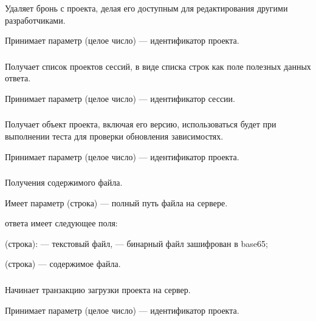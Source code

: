 Удаляет бронь с проекта, делая его доступным для редактирования другими разработчиками.

Принимает параметр  (целое число) — идентификатор проекта.

\subsubsection{}

Получает список проектов сессий, в виде списка строк как поле  полезных данных ответа.

Принимает параметр  (целое число) — идентификатор сессии.

\subsubsection{}

Получает объект проекта, включая его версию, использоваться будет при выполнении теста для проверки обновления зависимостях.

Принимает параметр  (целое число) — идентификатор проекта.

\subsubsection{}

Получения содержимого файла.

Имеет параметр  (строка) — полный путь файла на сервере.
 
 ответа имеет следующее поля:

\begin{icItems}
	\item {} (строка):  — текстовый файл,  — бинарный файл зашифрован в base65;
	\item {} (строка) — содержимое файла.
\end{icItems}

\subsubsection{}

Начинает транзакцию загрузки проекта на сервер.

Принимает параметр  (целое число) — идентификатор проекта.

